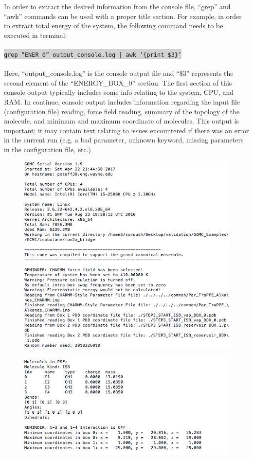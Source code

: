 \newline
\newline
In order to extract the desired information from the console file, ``grep'' and ``awk'' commands can be used with a proper title section. For example, in order to extract total energy of the system, the following command needs to be executed in terminal:\\\\
\colorbox{lightgray}{
\texttt{grep ``ENER\_0''   output\_console.log | awk '\{{print \$3}\}'}
}\\\\
Here, ``output\_console.log'' is the console output file and ``\$3'' represents the second element of the ``ENERGY\_BOX\_0'' section.
The first section of this console output typically includes some info relating to the system, CPU, and RAM. In continue, console output includes information regarding the input file (configuration file) reading, force field reading, summary of the topology of the molecule, and minimum and maximum coordinate of molecules. This output is important; it may contain text relating to issues encountered if there was an error in the current run (e.g. a bad parameter, unknown keyword, missing parameters in the configuration file, etc.)
\begin{figure}[H]
\includegraphics[scale=1]{images/out1}
\end{figure}
\begin{figure}[H]
\includegraphics[scale=1]{images/out2}
\end{figure}
